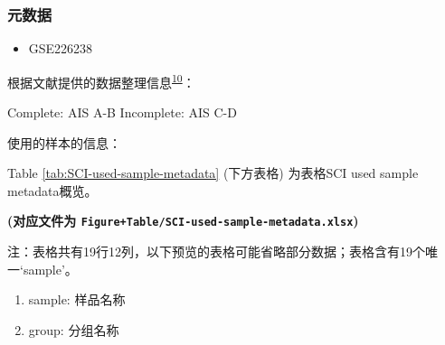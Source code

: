\documentclass[
]{article}
\providecommand{\tightlist}{%
  \setlength{\itemsep}{0pt}\setlength{\parskip}{0pt}}
\begin{document}
\hypertarget{ux5143ux6570ux636e}{%
\subsubsection{元数据}\label{ux5143ux6570ux636e}}

\begin{itemize}
\tightlist
\item
  GSE226238
\end{itemize}

根据文献提供的数据整理信息\textsuperscript{\protect\hyperlink{ref-ProfilingImmunMorris2023}{10}}：

Complete: AIS A-B
Incomplete: AIS C-D

使用的样本的信息：

Table \ref{tab:SCI-used-sample-metadata} (下方表格) 为表格SCI used sample metadata概览。

\textbf{(对应文件为 \texttt{Figure+Table/SCI-used-sample-metadata.xlsx})}

\begin{center}\begin{tcolorbox}[colback=gray!10, colframe=gray!50, width=0.9\linewidth, arc=1mm, boxrule=0.5pt]注：表格共有19行12列，以下预览的表格可能省略部分数据；表格含有19个唯一`sample'。
\end{tcolorbox}
\end{center}
\begin{center}\begin{tcolorbox}[colback=gray!10, colframe=gray!50, width=0.9\linewidth, arc=1mm, boxrule=0.5pt]\begin{enumerate}\tightlist
\item sample: 样品名称
\item group: 分组名称
\end{enumerate}\end{tcolorbox}
\end{center}
\end{document}
